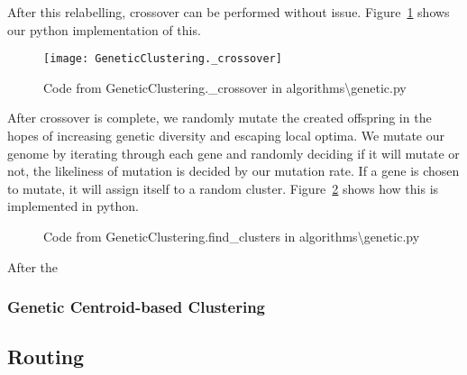 \noindent
After this relabelling, crossover can be performed without issue. Figure~\ref{fig:GeneticClustering._crossover} shows
our python implementation of this.
\begin{figure}[H]
    \centering
    \texttt{[image: GeneticClustering.\_crossover]}
    \caption{Code from GeneticClustering.\_crossover in algorithms\textbackslash genetic.py}\label{fig:GeneticClustering._crossover}
\end{figure}

After crossover is complete, we randomly mutate the created offspring in the hopes of increasing genetic diversity
and escaping local optima.
We mutate our genome by iterating through each gene and randomly deciding if it will mutate or not, the likeliness
of mutation is decided by our mutation rate.
If a gene is chosen to mutate, it will assign itself to a random cluster.
Figure~\ref{fig:GeneticClustering.find_clusters.mutation} shows how this is implemented in python.
\begin{figure}[H]
    \centering
    \caption{Code from GeneticClustering.find\_clusters in algorithms\textbackslash genetic.py}\label{fig:GeneticClustering.find_clusters.mutation}
\end{figure}

\noindent
After the

\noindent
{}

\subsubsection{Genetic Centroid-based Clustering}

\subsection{Routing}\label{subsec:routing}
